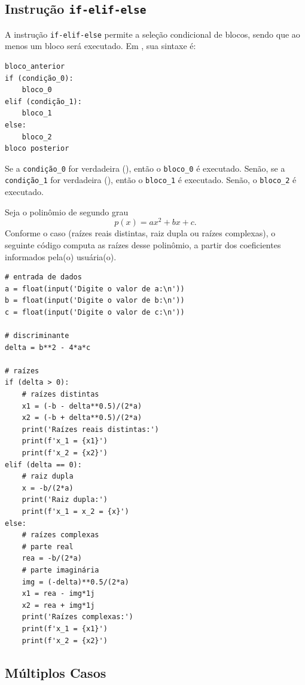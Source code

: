 \subsection{Instrução \texttt{if-elif-else}}

A instrução \lstinline+if-elif-else+ permite a seleção condicional de blocos, sendo que ao menos um bloco será executado. Em {\python}, sua sintaxe é:

\begin{lstlisting}
bloco_anterior
if (condição_0):
    bloco_0
elif (condição_1):
    bloco_1
else:
    bloco_2
bloco posterior
\end{lstlisting}

Se a \lstinline+condição_0+ for verdadeira ({\PYTHONTrue}), então o \lstinline+bloco_0+ é executado. Senão, se a \lstinline+condição_1+ for verdadeira ({\PYTHONTrue}), então o \lstinline+bloco_1+ é executado. Senão, o \lstinline+bloco_2+ é executado.

\begin{ex}
  Seja o polinômio de segundo grau
  \begin{equation}
    p(x) = ax^2 + bx + c.
  \end{equation}
  Conforme o caso (raízes reais distintas, raiz dupla ou raízes complexas), o seguinte código computa as raízes desse polinômio, a partir dos coeficientes informados pela(o) usuária(o).

\begin{lstlisting}
# entrada de dados
a = float(input('Digite o valor de a:\n'))
b = float(input('Digite o valor de b:\n'))
c = float(input('Digite o valor de c:\n'))

# discriminante
delta = b**2 - 4*a*c

# raízes
if (delta > 0):
    # raízes distintas
    x1 = (-b - delta**0.5)/(2*a)
    x2 = (-b + delta**0.5)/(2*a)
    print('Raízes reais distintas:')
    print(f'x_1 = {x1}')
    print(f'x_2 = {x2}')
elif (delta == 0):
    # raiz dupla
    x = -b/(2*a)
    print('Raiz dupla:')
    print(f'x_1 = x_2 = {x}')
else:
    # raízes complexas
    # parte real
    rea = -b/(2*a)
    # parte imaginária
    img = (-delta)**0.5/(2*a)
    x1 = rea - img*1j
    x2 = rea + img*1j
    print('Raízes complexas:')
    print(f'x_1 = {x1}')
    print(f'x_2 = {x2}')
\end{lstlisting}

\end{ex}

\subsection{Múltiplos Casos}

